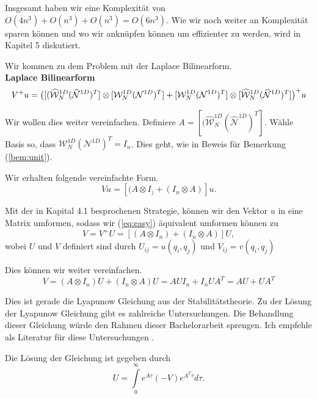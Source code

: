 Insgesamt haben wir eine Komplexität von $O(4n^3)+O(n^3)+O(n^3)=O(6n^3)$.
Wie wir noch weiter an Komplexität sparen können und wo wir anknüpfen können um effizienter zu werden, wird in Kapitel 5 diskutiert.

Wir kommen zu dem Problem mit der Laplace Bilinearform.  \\
\textbf{Laplace Bilinearform}
\begin{equation*}
V^{+}u = \big{(} [(\widehat{\mathcal{W}}_N^{1D} (\widehat{\mathcal{N}}^{1D})^T] \otimes [\mathcal{W}_N^{1D} (\mathcal{N}^{1D})^T]  +  [\mathcal{W}_N^{1D} (\mathcal{N}^{1D})^T] \otimes [\widehat{\mathcal{W}}_N^{1D} (\widehat{\mathcal{N}}^{1D})^T]  \big{)}^+ u
\end{equation*}

Wir wollen dies weiter vereinfachen. Definiere $A=[(\widehat{\mathcal{W}}_N^{1D} (\widehat{\mathcal{N}}^{1D})^T]$. Wähle Basis so, dass $\mathcal{W}_N^{1D} (\mathcal{N}^{1D})^T  = I_n$. Dies geht, wie in Beweis für Bemerkung (\ref{bem:unit}).

Wir erhalten folgende vereinfachte Form.
\begin{equation*} \label{eq:easy}
Vu =[(A \otimes I_) + (I_n \otimes A)]u.
\end{equation*}

Mit der in Kapital 4.1 besprochenen Strategie, können wir den Vektor $u$ in eine Matrix umformen, sodass wir (\ref{eq:easy}) äquivalent umformen können zu
\begin{equation*} \label{eq:easy}
V=V^{+}U =[(A \otimes I_n) + (I_n \otimes A)]U,
\end{equation*}
wobei $U$  und $V$ definiert sind durch $U_{ij}=u(q_i,q_j)$ und $V_{ij}=v(q_i,q_j)$

Dies können wir weiter vereinfachen.
\begin{equation*} \label{eq:easy}
V=(A \otimes I_n)U + (I_n \otimes A)U = AUI_n + I_n U A^T = AU + UA^T
\end{equation*}

Dies ist gerade die Lyapunow Gleichung aus der Stabilitätstheorie. Zu der Lösung der Lyapunow Gleichung gibt es zahlreiche Untersuchungen. Die Behandlung dieser Gleichung würde den Rahmen dieser Bachelorarbeit sprengen. Ich empfehle als Literatur für diese Untersuchungen \cite{Lyapunov}.

Die Lösung der Gleichung ist gegeben durch
\begin{equation*}
U = \int\limits_{0}^{\infty} e^{A \tau} (-V) e^{A^T \tau} d\tau.
\end{equation*}

